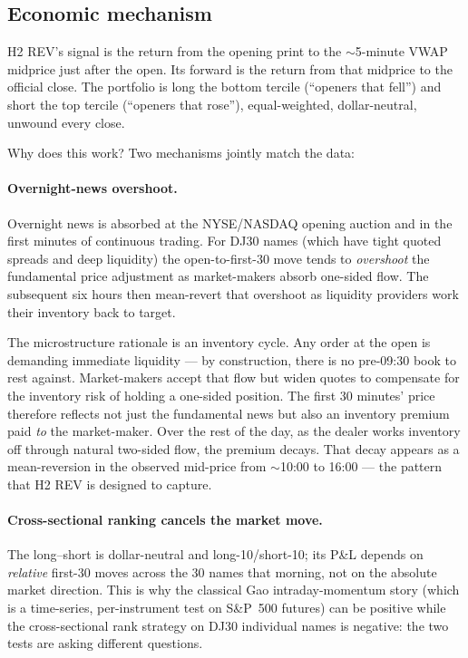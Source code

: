 \documentclass[10pt,conference,compsoc]{IEEEtran}
\begin{document}
\subsection{Economic mechanism}

H2 REV's signal is the return from the opening print to the
$\sim$5-minute VWAP midprice just after the open. Its forward is the
return from that midprice to the official close. The portfolio is
long the bottom tercile (``openers that fell'') and short the top
tercile (``openers that rose''), equal-weighted, dollar-neutral,
unwound every close.

Why does this work? Two mechanisms jointly match the data:

\paragraph{Overnight-news overshoot.} Overnight news is absorbed at
the NYSE/NASDAQ opening auction and in the first minutes of
continuous trading. For DJ30 names (which have tight quoted spreads
and deep liquidity) the open-to-first-30 move tends to \emph{overshoot}
the fundamental price adjustment as market-makers absorb one-sided
flow. The subsequent six hours then mean-revert that overshoot as
liquidity providers work their inventory back to target.

The microstructure rationale is an inventory cycle. Any order at
the open is demanding immediate liquidity --- by construction, there
is no pre-09:30 book to rest against. Market-makers accept that
flow but widen quotes to compensate for the inventory risk of
holding a one-sided position. The first 30 minutes' price therefore
reflects not just the fundamental news but also an inventory
premium paid \emph{to} the market-maker. Over the rest of the day,
as the dealer works inventory off through natural two-sided flow,
the premium decays. That decay appears as a mean-reversion in the
observed mid-price from $\sim$10:00 to 16:00 --- the pattern that
H2 REV is designed to capture.

\paragraph{Cross-sectional ranking cancels the market move.} The
long--short is dollar-neutral and long-10/short-10; its P\&L depends
on \emph{relative} first-30 moves across the 30 names that morning,
not on the absolute market direction. This is why the classical
Gao intraday-momentum story (which is a time-series, per-instrument
test on S\&P~500 futures) can be positive while the cross-sectional
rank strategy on DJ30 individual names is negative: the two tests
are asking different questions.
\end{document}
